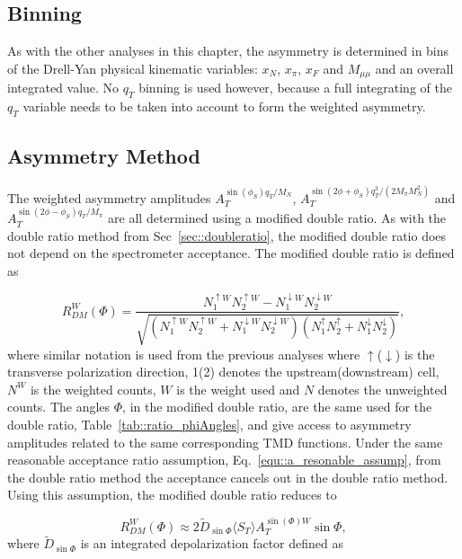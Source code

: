 \subsection{Binning}
As with the other analyses in this chapter, the asymmetry is determined in bins
of the Drell-Yan physical kinematic variables: $x_N$, $x_\pi$, $x_F$ and
$M_{\mu\mu}$ and an overall integrated value.  No $q_T$ binning is used however,
because a full integrating of the $q_T$ variable needs to be taken into account
to form the weighted asymmetry.  

\subsection{Asymmetry Method}
The weighted asymmetry amplitudes $A_T^{\sin(\phi_S) q_T/M_N}$,
$A_T^{\sin(2\phi+\phi_S) q^3_T/(2M_{\pi}M_N^2)}$ and $A_T^{\sin(2\phi-\phi_S)
  q_T/M_{\pi}}$ are all determined using a modified double ratio.  As with the
double ratio method from Sec~\ref{sec::doubleratio}, the modified double ratio
does not depend on the spectrometer acceptance.  The modified double ratio is
defined as

\begin{equation}
  \label{equ::modified_dr}
  R^W_{DM}(\Phi)=
  \frac{N^{\uparrow W}_{1}N^{\uparrow W}_{2}
    - N^{\downarrow W}_{1}N^{\downarrow W}_{2}}
       {\sqrt{(N^{\uparrow W}_{1}N^{\uparrow W}_{2}
         + N^{\downarrow W}_{1}N^{\downarrow W}_{2})
         (N^{\uparrow}_{1}N^{\uparrow}_{2}
         + N^{\downarrow}_{1}N^{\downarrow}_{2})}},
\end{equation}
\noindent
where similar notation is used from the previous analyses where
$\uparrow$($\downarrow$) is the transverse polarization direction, 1(2) denotes
the upstream(downstream) cell, $N^{W}$ is the weighted counts, $W$ is the weight
used and $N$ denotes the unweighted counts.  The angles $\Phi$, in the modified
double ratio, are the same used for the double ratio,
Table~\ref{tab::ratio_phiAngles}, and give access to asymmetry amplitudes
related to the same corresponding TMD functions.  Under the same reasonable
acceptance ratio assumption, Eq.~\ref{equ::a_resonable_assump}, from the double
ratio method the acceptance cancels out in the double ratio method.  Using this
assumption, the modified double ratio reduces to

\begin{equation}
  \label{equ::dr_fit_form}
  R^W_{DM}(\Phi) \approx 2 \tilde{D}_{\sin\Phi}\langle S_T \rangle
  A_T^{\sin(\Phi)W} \sin\Phi,
\end{equation}
\noindent
where $\tilde{D}_{\sin\Phi}$ is an integrated depolarization factor defined as

